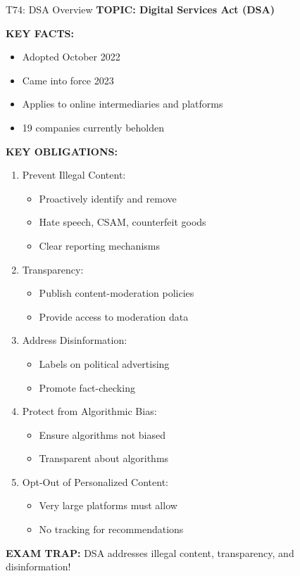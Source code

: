 \documentclass[8pt]{beamer}
\begin{document}
	\begin{frame}{T74: DSA Overview}
		\fontsize{6.5}{7.5}\selectfont
		\textbf{TOPIC: Digital Services Act (DSA)}
		
		\vspace{0.1cm}
		\textbf{KEY FACTS:}
		\begin{itemize}
			\item Adopted October 2022
			\item Came into force 2023
			\item Applies to online intermediaries and platforms
			\item 19 companies currently beholden
		\end{itemize}
		
		\vspace{0.1cm}
		\textbf{KEY OBLIGATIONS:}
		\begin{enumerate}
			\item \textcolor{myblue}{Prevent Illegal Content:}
			\begin{itemize}
				\item Proactively identify and remove
				\item Hate speech, CSAM, counterfeit goods
				\item Clear reporting mechanisms
			\end{itemize}
			\item \textcolor{myblue}{Transparency:}
			\begin{itemize}
				\item Publish content-moderation policies
				\item Provide access to moderation data
			\end{itemize}
			\item \textcolor{myblue}{Address Disinformation:}
			\begin{itemize}
				\item Labels on political advertising
				\item Promote fact-checking
			\end{itemize}
			\item \textcolor{myblue}{Protect from Algorithmic Bias:}
			\begin{itemize}
				\item Ensure algorithms not biased
				\item Transparent about algorithms
			\end{itemize}
			\item \textcolor{myblue}{Opt-Out of Personalized Content:}
			\begin{itemize}
				\item Very large platforms must allow
				\item No tracking for recommendations
			\end{itemize}
		\end{enumerate}
		
		\textcolor{myred}{\textbf{EXAM TRAP:}} DSA addresses \textcolor{myblue}{illegal content, transparency, and disinformation}!
	\end{frame}
	
\end{document}

